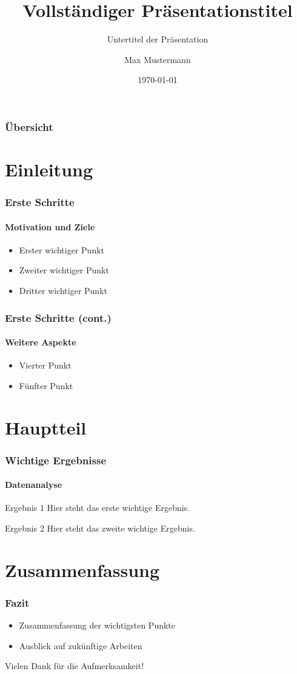 \documentclass{ltx-talk}
\title[Kurztitel]{Vollständiger Präsentationstitel}
\subtitle{Untertitel der Präsentation}
\author[M. Mustermann]{Max Mustermann}
\institute{Universität Beispielstadt}
\date{\today}
\begin{document}
\begin{frame}
  \maketitle
\end{frame}

\begin{frame}
  \frametitle{Übersicht}
  \tableofcontents
\end{frame}

\section{Einleitung}

\begin{frame}
  \frametitle{Erste Schritte}
  \framesubtitle{Motivation und Ziele}
  \begin{itemize}
    \item Erster wichtiger Punkt
    \item Zweiter wichtiger Punkt
    \item Dritter wichtiger Punkt
  \end{itemize}
\end{frame}

\begin{frame}
  \frametitle{Erste Schritte (cont.)}
  \framesubtitle{Weitere Aspekte}
  \begin{itemize}
    \item Vierter Punkt
    \item Fünfter Punkt
  \end{itemize}
\end{frame}

\section{Hauptteil}

\begin{frame}
  \frametitle{Wichtige Ergebnisse}
  \framesubtitle{Datenanalyse}
  \begin{block}{Ergebnis 1}
    Hier steht das erste wichtige Ergebnis.
  \end{block}
  
  \begin{block}{Ergebnis 2}
    Hier steht das zweite wichtige Ergebnis.
  \end{block}
\end{frame}

\section{Zusammenfassung}

\begin{frame}
  \frametitle{Fazit}
  \begin{itemize}
    \item Zusammenfassung der wichtigsten Punkte
    \item Ausblick auf zukünftige Arbeiten
  \end{itemize}
  
  \vfill
  \begin{center}
    \large Vielen Dank für die Aufmerksamkeit!
  \end{center}
\end{frame}
\end{document}
